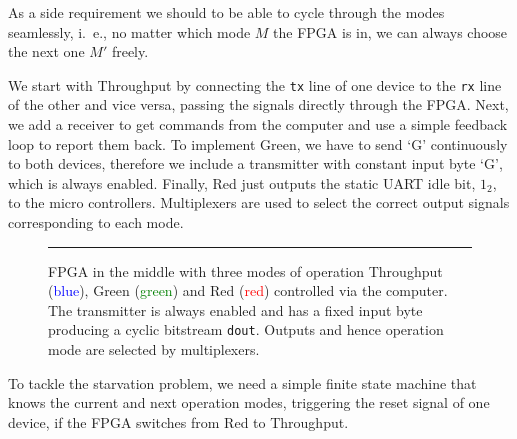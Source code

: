 As a side requirement we should to be able to cycle through the modes seamlessly, i.~e., no matter which mode $M$ the FPGA is in, we can always choose the next one $M'$ freely.

We start with \textsf{Throughput} by connecting the \texttt{tx} line of one device to the \texttt{rx} line of the other and vice versa, passing the signals directly through the FPGA. 
Next, we add a receiver to get commands from the computer and use a simple feedback loop to report them back. 
To implement \textsf{Green}, we have to send `G' continuously to both devices, therefore we include a transmitter with constant input byte `G', which is always enabled.
Finally, \textsf{Red} just outputs the static UART idle bit, $1_2$, to the micro controllers. 
Multiplexers are used to select the correct output signals corresponding to each mode. 

\begin{figure}[tb]
    \begin{center}
        
        \caption{FPGA in the middle with three modes of operation \textsf{Throughput} (\textcolor{blue}{blue}), \textsf{Green} (\textcolor{green}{green}) and \textsf{Red} (\textcolor{red}{red}) controlled via the computer. The transmitter is always enabled and has a fixed input byte producing a cyclic bitstream \texttt{dout}. Outputs and hence operation mode are selected by multiplexers.}
        \label{fig:as3-schematic}
        \vspace{1em}\hrule
    \end{center}
\end{figure}

To tackle the starvation problem, we need a simple finite state machine that knows the current and next operation modes, triggering the reset signal of one device, if the FPGA switches from \textsf{Red} to \textsf{Throughput}.
